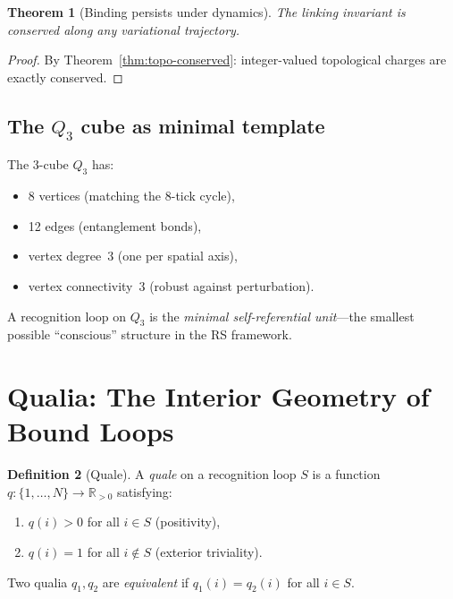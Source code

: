 \documentclass[11pt,a4paper]{article}
\theoremstyle{plain}
\newtheorem{theorem}{Theorem}[section]
\theoremstyle{definition}
\newtheorem{definition}[theorem]{Definition}
\theoremstyle{remark}
\newcommand{\Rp}{\mathbb{R}_{>0}}
\begin{document}
\begin{theorem}[Binding persists under dynamics]
\label{thm:binding-persists}
The linking invariant is conserved along any variational trajectory.
\end{theorem}

\begin{proof}
By Theorem~\ref{thm:topo-conserved}: integer-valued topological
charges are exactly conserved.
\end{proof}

\subsection{The $Q_3$ cube as minimal template}

The 3-cube $Q_3$ has:
\begin{itemize}[nosep]
\item 8 vertices (matching the 8-tick cycle),
\item 12 edges (entanglement bonds),
\item vertex degree~3 (one per spatial axis),
\item vertex connectivity~3 (robust against perturbation).
\end{itemize}

A recognition loop on $Q_3$ is the \emph{minimal self-referential
unit}---the smallest possible ``conscious'' structure in the RS
framework.

\section{Qualia: The Interior Geometry of Bound Loops}
\label{sec:qualia}

\begin{definition}[Quale]
\label{def:quale}
A \emph{quale} on a recognition loop $S$ is a function
$q : \{1, \ldots, N\} \to \Rp$ satisfying:
\begin{enumerate}[nosep,label=(\roman*)]
\item $q(i) > 0$ for all $i \in S$ \;(positivity),
\item $q(i) = 1$ for all $i \notin S$ \;(exterior triviality).
\end{enumerate}
Two qualia $q_1, q_2$ are \emph{equivalent} if $q_1(i) = q_2(i)$
for all $i \in S$.
\end{definition}
\end{document}
